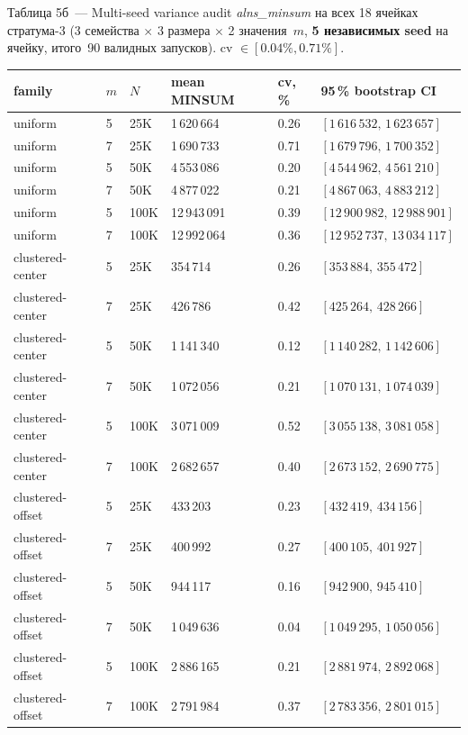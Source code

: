 \documentclass[a4paper,14pt]{extreport}
\begin{document}
\medskip
\noindent Таблица 5б~--- Multi-seed variance audit \emph{alns\_minsum} на всех 18 ячейках стратума-3 (3 семейства $\times$ 3 размера $\times$ 2 значения~$m$, \textbf{5 независимых seed} на ячейку, итого~90 валидных запусков). cv $\in [0.04\%, 0.71\%]$.

\begin{center}\footnotesize
\begin{tabular}{|L{2.4cm}|C{0.4cm}|R{0.7cm}|R{1.7cm}|R{0.8cm}|R{3.2cm}|}
\hline
\textbf{family} & $m$ & $N$ & \textbf{mean MINSUM} & \textbf{cv,\,\%} & \textbf{95\,\% bootstrap CI} \\
\hline
uniform              & 5 & 25K  &     1\,620\,664 & 0.26 & $[1\,616\,532,\,1\,623\,657]$ \\
\hline
uniform              & 7 & 25K  &     1\,690\,733 & 0.71 & $[1\,679\,796,\,1\,700\,352]$ \\
\hline
uniform              & 5 & 50K  &     4\,553\,086 & 0.20 & $[4\,544\,962,\,4\,561\,210]$ \\
\hline
uniform              & 7 & 50K  &     4\,877\,022 & 0.21 & $[4\,867\,063,\,4\,883\,212]$ \\
\hline
uniform              & 5 & 100K &    12\,943\,091 & 0.39 & $[12\,900\,982,\,12\,988\,901]$ \\
\hline
uniform              & 7 & 100K &    12\,992\,064 & 0.36 & $[12\,952\,737,\,13\,034\,117]$ \\
\hline
clustered-center     & 5 & 25K  &       354\,714 & 0.26 & $[353\,884,\,355\,472]$ \\
\hline
clustered-center     & 7 & 25K  &       426\,786 & 0.42 & $[425\,264,\,428\,266]$ \\
\hline
clustered-center     & 5 & 50K  &     1\,141\,340 & 0.12 & $[1\,140\,282,\,1\,142\,606]$ \\
\hline
clustered-center     & 7 & 50K  &     1\,072\,056 & 0.21 & $[1\,070\,131,\,1\,074\,039]$ \\
\hline
clustered-center     & 5 & 100K &     3\,071\,009 & 0.52 & $[3\,055\,138,\,3\,081\,058]$ \\
\hline
clustered-center     & 7 & 100K &     2\,682\,657 & 0.40 & $[2\,673\,152,\,2\,690\,775]$ \\
\hline
clustered-offset     & 5 & 25K  &       433\,203 & 0.23 & $[432\,419,\,434\,156]$ \\
\hline
clustered-offset     & 7 & 25K  &       400\,992 & 0.27 & $[400\,105,\,401\,927]$ \\
\hline
clustered-offset     & 5 & 50K  &       944\,117 & 0.16 & $[942\,900,\,945\,410]$ \\
\hline
clustered-offset     & 7 & 50K  &     1\,049\,636 & 0.04 & $[1\,049\,295,\,1\,050\,056]$ \\
\hline
clustered-offset     & 5 & 100K &     2\,886\,165 & 0.21 & $[2\,881\,974,\,2\,892\,068]$ \\
\hline
clustered-offset     & 7 & 100K &     2\,791\,984 & 0.37 & $[2\,783\,356,\,2\,801\,015]$ \\
\hline
\end{tabular}
\end{center}
\end{document}
